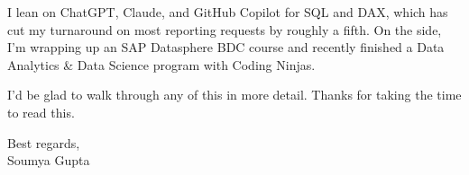 \documentclass[10pt, letterpaper]{article}
\begin{document}
I lean on ChatGPT, Claude, and GitHub Copilot for SQL and DAX, which has cut my turnaround on most reporting requests by roughly a fifth. On the side, I'm wrapping up an SAP Datasphere BDC course and recently finished a Data Analytics \& Data Science program with Coding Ninjas.

I'd be glad to walk through any of this in more detail. Thanks for taking the time to read this.

\vspace{8pt}

Best regards,\\[10pt]
Soumya Gupta

\end{document}
